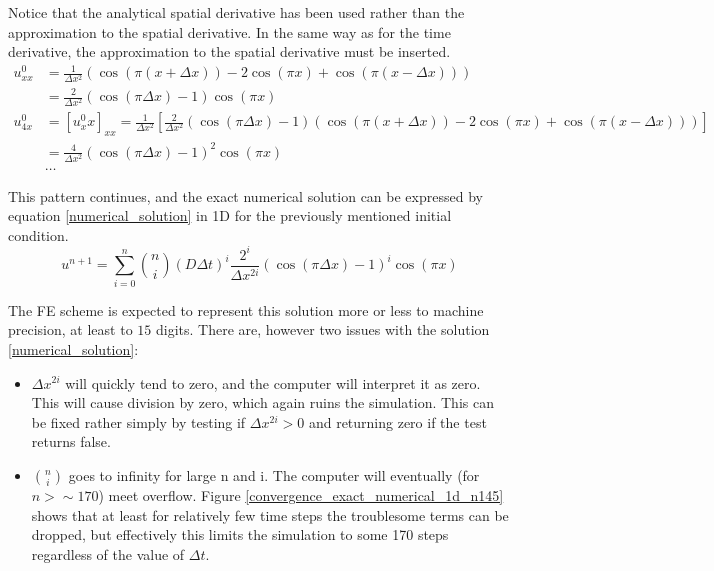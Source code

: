 Notice that the analytical spatial derivative has been used rather than the approximation to the spatial derivative. 
In the same way as for the time derivative, the approximation to the spatial derivative must be inserted. 
\begin{align*}
 u^0_{xx} &= \frac{1}{\Delta x^2}\left(\cos(\pi(x+\Delta x)) -2\cos(\pi x) +\cos(\pi(x-\Delta x))\right) \\
 &= \frac{2}{\Delta x^2}\left(\cos(\pi\Delta x)-1\right)\cos(\pi x)\\
 u^0_{4x} &= [u^0_xx]_{xx} = \frac{1}{\Delta x^2}\left[\frac{2}{\Delta x^2}\left(\cos(\pi\Delta x)-1\right)\left(\cos(\pi(x+\Delta x)) -2\cos(\pi x) +\cos(\pi(x-\Delta x))\right)\right]\\
 &= \frac{4}{\Delta x^2}\left(\cos(\pi\Delta x)-1\right)^2\cos(\pi x)\\
 &\dots
\end{align*}

This pattern continues, and the exact numerical solution can be expressed by equation \eqref{numerical_solution} in 1D for the previously mentioned initial condition.
\begin{equation}\label{numerical_solution}
  u^{n+1} = \sum\limits_{i=0}^n {n\choose i}\left(D\Delta t\right)^i\frac{2^i}{\Delta x^{2i}}\left(\cos(\pi\Delta x)-1\right)^i\cos(\pi x)
\end{equation}

The FE scheme is expected to represent this solution more or less to machine precision, at least to $15$ digits. 
There are, however two issues with the solution \eqref{numerical_solution}:
\begin{itemize}
 \item $\Delta x^{2i}$ will quickly tend to zero, and the computer will interpret it as zero. This will cause division by zero, which again ruins the simulation. This can be fixed rather simply by testing if $\Delta x^{2i}>0$ and returning zero if the test returns false.
 \item ${n\choose i}$ goes to infinity for large n and i. The computer will eventually (for $n>\sim170$) meet overflow. Figure \ref{convergence_exact_numerical_1d_n145} shows that at least for relatively few time steps the troublesome terms can be dropped, but effectively this limits the simulation to some 170 steps regardless of the value of $\Delta t$.
\end{itemize}

